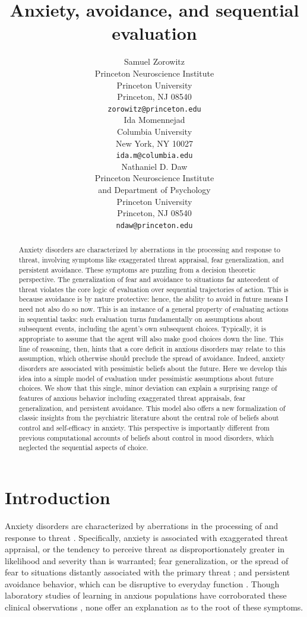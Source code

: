 \documentclass[11pt]{article} %
\title{Anxiety, avoidance, and sequential evaluation}
\author{
Samuel Zorowitz \\
Princeton Neuroscience Institute\\
Princeton University\\
Princeton, NJ 08540 \\
\texttt{zorowitz@princeton.edu} \\
\And
Ida Momennejad \\
Columbia University\\
New York, NY 10027 \\
\texttt{ida.m@columbia.edu} \\
\And
Nathaniel D. Daw \\
Princeton Neuroscience Institute\\
and Department of Psychology\\
Princeton University\\
Princeton, NJ 08540 \\
\texttt{ndaw@princeton.edu} \\
}
\begin{document}
\maketitle

\begin{abstract}
Anxiety disorders are characterized by aberrations in the processing and response to threat, involving symptoms like exaggerated threat appraisal, fear generalization, and persistent avoidance. These symptoms are puzzling from a decision theoretic perspective. The generalization of fear and avoidance to situations far antecedent of threat violates the core logic of evaluation over sequential trajectories of action. This is because avoidance is by nature protective: hence, the ability to avoid in future means I need not also do so now. This is an instance of a general property of evaluating actions in sequential tasks: such evaluation turns fundamentally on assumptions about subsequent events, including the agent's own subsequent choices. Typically, it is appropriate to assume that the agent will also make good choices down the line. This line of reasoning, then, hints that a core deficit in anxious disorders may relate to this assumption, which otherwise should preclude the spread of avoidance. Indeed, anxiety disorders are associated with pessimistic beliefs about the future. Here we develop this idea into a simple model of evaluation under pessimistic assumptions about future choices. We show that this single, minor deviation can explain a surprising range of features of anxious behavior  including exaggerated threat appraisals, fear generalization, and persistent avoidance. This model also offers a new formalization of classic insights from the psychiatric literature about the central role of beliefs about control and self-efficacy in anxiety. This perspective is importantly different from previous computational accounts of beliefs about control in mood disorders, which neglected the sequential aspects of choice. 
\end{abstract}



\startmain

\section{Introduction}

Anxiety disorders are characterized by aberrations in the processing of and response to threat \citep{dsm5, ClarkBeck2011}. Specifically, anxiety is associated with exaggerated threat appraisal, or the tendency to perceive threat as disproportionately greater in likelihood and severity than is warranted; fear generalization, or the spread of fear to situations distantly associated with the primary threat \citep{dymond2015}; and persistent avoidance behavior, which can be disruptive to everyday function \citep{Arnaudova2017}. Though laboratory studies of learning in anxious populations have corroborated these clinical observations \citep{Harle2017, norbury2018, Aylward2019}, none offer an explanation as to the root of these symptoms.
\end{document}
